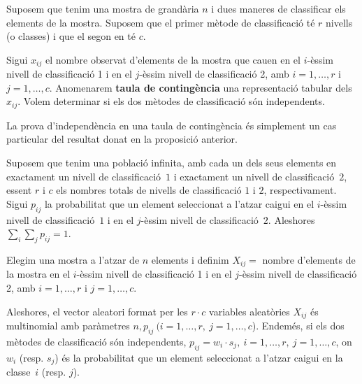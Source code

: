 Suposem que tenim una mostra de grand\`aria $n$ i dues maneres de 
classificar els elements de la mostra. Suposem que el primer m\`etode de 
classificaci\'o t\'e $r$ nivells (o classes) i que el segon en t\'e $c$.

Sigui $x_{ij}$ el nombre observat d'elements de la mostra que cauen en el
$i$-\`essim nivell de classificaci\'o 1 i en el $j$-\`essim nivell de classificaci\'o 2,
amb $i = 1, \ldots , r$ i $ j = 1, \ldots , c$. Anomenarem 
{\bf taula de conting\`encia}
una representaci\'o tabular dels $x_{ij}$. 
Volem determinar si els dos m\`etodes de
classificaci\'o s\'on independents.

La prova d'independ\`encia 
en una taula de conting\`encia 
\'es simplement un cas particular del resultat donat en la proposici\'o anterior.

Suposem que tenim una poblaci\'o infinita,
 amb cada un dels seus elements en
exactament un nivell de classificaci\'o~$1$ i exactament un 
nivell de classificaci\'o~$2$, essent $r$ i $c$ els nombres totals de nivells de 
classificaci\'o $1$ i $2$, respectivament. Sigui $p_{ij}$ la probabilitat que un 
element seleccionat a l'atzar caigui en el $i$-\`essim nivell de 
classificaci\'o~$1$ i en el $j$-\`essim nivell
de classificaci\'o~$2$. Aleshores $\displaystyle \sum_i \sum_j p_{ij} = 1$.

Elegim una mostra a l'atzar de $n$ elements i definim $X_{ij} =$ nombre
d'elements de la mostra en el $i$-\`essim nivell de classificaci\'o 1 i en el
$j$-\`essim nivell de classificaci\'o 2, amb $i = 1, \ldots , r$ i $ j = 1, \ldots ,
c$.

Aleshores, el vector aleatori 
format per les $r \cdot c$ variables aleat\`ories
$X_{ij}$ \'es multinomial amb par\`ametres 
$n, p_{ij} \ (i = 1, \ldots , r, \ j = 1,
\ldots , c$). Endem\'es, si els dos m\`etodes de classificaci\'o s\'on independents,
$p_{ij} = w_i \cdot s_j, \ i = 1, \ldots , r, \ j = 1, \ldots , c$, on $w_i$
(resp. $s_j$) \'es la probabilitat que un element seleccionat a l'atzar caigui
en la classe~$i$ (resp. $j$).


